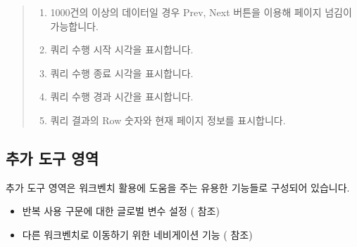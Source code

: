 \documentclass[letterpaper,10pt,english]{sphinxmanual}
\begin{document}
\begin{quote}
\begin{enumerate}
\item {} 
 1000건의 이상의 데이터일 경우 Prev, Next 버튼을 이용해 페이지 넘김이 가능합니다.

\item {} 
 쿼리 수행 시작 시각을 표시합니다.

\item {} 
 쿼리 수행 종료 시각을 표시합니다.

\item {} 
 쿼리 수행 경과 시간을 표시합니다.

\item {} 
 쿼리 결과의 Row 숫자와 현재 페이지 정보를 표시합니다.

\end{enumerate}
\end{quote}


\subsection{추가 도구 영역}
\label{\detokenize{discovery/part06/06_03-use_a_workbench:workbench-use-5}}\label{\detokenize{discovery/part06/06_03-use_a_workbench:id8}}
추가 도구 영역은 워크벤치 활용에 도움을 주는 유용한 기능들로 구성되어 있습니다.
\begin{itemize}
\item {} 
반복 사용 구문에 대한 글로벌 변수 설정 ({\hyperref[\detokenize{discovery/part06/06_03-use_a_workbench:global-variable}]{}} 참조)

\item {} 
다른 워크벤치로 이동하기 위한 네비게이션 기능 ({\hyperref[\detokenize{discovery/part06/06_03-use_a_workbench:workbench-navigation}]{}} 참조)

\end{itemize}
\end{document}
